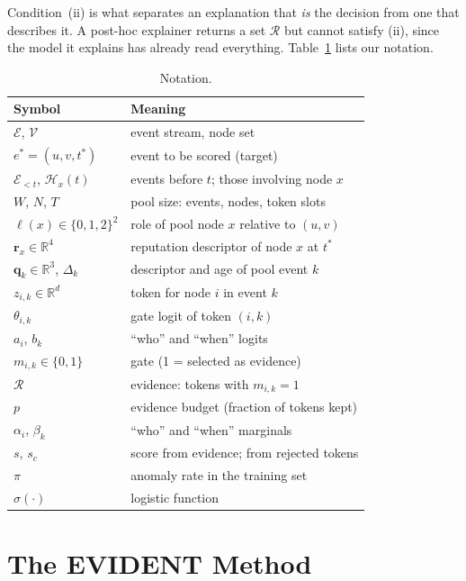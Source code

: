 \documentclass[pdflatex,sn-basic]{sn-jnl}
\newcommand{\Ecal}{\mathcal{E}}
\newcommand{\Vcal}{\mathcal{V}}
\newcommand{\Hcal}{\mathcal{H}}
\newcommand{\Rcal}{\mathcal{R}}
\newcommand{\R}{\mathbb{R}}
\theoremstyle{definition}
\theoremstyle{plain}
\begin{document}
Condition~(ii) is what separates an explanation that \emph{is} the decision
from one that describes it. A post-hoc explainer returns a set $\Rcal$ but
cannot satisfy (ii), since the model it explains has already read everything.
Table~\ref{tab:notation} lists our notation.

\begin{table}[!t]
\caption{Notation.}
\label{tab:notation}
\centering
\footnotesize
\renewcommand{\arraystretch}{1.12}
\begin{tabular}{@{}ll@{}}
\toprule
Symbol & Meaning\\
\midrule
$\Ecal$, $\Vcal$ & event stream, node set\\
$e^\ast=(u,v,t^\ast)$ & event to be scored (target)\\
$\Ecal_{<t}$, $\Hcal_x(t)$ & events before $t$; those involving node $x$\\
$W$, $N$, $T$ & pool size: events, nodes, token slots\\
$\ell(x)\in\{0,1,2\}^2$ & role of pool node $x$ relative to $(u,v)$\\
$\mathbf{r}_x\in\R^4$ & reputation descriptor of node $x$ at $t^\ast$\\
$\mathbf{q}_k\in\R^3$, $\Delta_k$ & descriptor and age of pool event $k$\\
$z_{i,k}\in\R^d$ & token for node $i$ in event $k$\\
$\theta_{i,k}$ & gate logit of token $(i,k)$\\
$a_i$, $b_k$ & ``who'' and ``when'' logits\\
$m_{i,k}\in\{0,1\}$ & gate (1 = selected as evidence)\\
$\Rcal$ & evidence: tokens with $m_{i,k}=1$\\
$p$ & evidence budget (fraction of tokens kept)\\
$\alpha_i$, $\beta_k$ & ``who'' and ``when'' marginals\\
$s$, $s_c$ & score from evidence; from rejected tokens\\
$\pi$ & anomaly rate in the training set\\
$\sigma(\cdot)$ & logistic function\\
\bottomrule
\end{tabular}
\end{table}

\section{The EVIDENT Method}
\label{sec:method}
\end{document}
